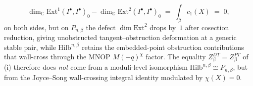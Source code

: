 \begin{proposition}
\begin{enumerate}[label=\textup{(\roman*)},leftmargin=1.5em]
\[
 \dim_{\mathbb C}\mathrm{Ext}^1(I^\bullet, I^\bullet)_0 - \dim_{\mathbb C}\mathrm{Ext}^2(I^\bullet, I^\bullet)_0 \;=\; \int_\beta c_1(X) \;=\; 0,
\]
on both sides, but on $P_{n,\beta}$ the defect $\dim\mathrm{Ext}^2$ drops by~$1$ after cosection reduction, giving unobstructed tangent--obstruction deformation at a generic stable pair, while $\mathrm{Hilb}^{n,\beta}$ retains the embedded-point obstruction contributions that wall-cross through the MNOP $M(-q)^{\chi}$ factor. The equality $Z^{DT}_\beta = Z^{PT}_\beta$ of (i) therefore does \emph{not} come from a moduli-level isomorphism $\mathrm{Hilb}^{n,\beta}\cong P_{n,\beta}$, but from the Joyce--Song wall-crossing integral identity modulated by $\chi(X) = 0$.
\end{enumerate}
\end{proposition}

